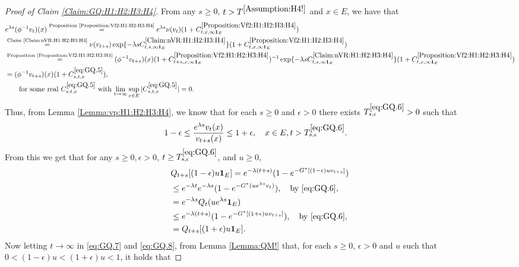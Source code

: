 \documentclass[12pt,a4paper]{amsart}
\numberwithin{equation}{section}
\theoremstyle{plain}
\theoremstyle{definition}
\theoremstyle{remark}
\newcounter{N}
\newcounter{n}[N]
\begin{document}
\begin{proof}[Proof of Claim \ref{Claim:GQ:H1:H2:H3:H4}]
From any $s\geq 0$, $t>T^{\ref{Assumption:H4!}}$ and $x\in E$, we have that
\begin{align}
& e^{\lambda s}(\phi^{-1}v_t)(x) 
\overset{\text{Proposition \ref{Proposition:Vf2:H1:H2:H3:H4}}}= e^{\lambda s}\nu(v_{t})(1+ C^{\ref{Proposition:Vf2:H1:H2:H3:H4}}_{t,x,\infty \mathbf 1_E})
\\&\overset{\text{Claim \ref{Claim:nVR:H1:H2:H3:H4}}}=\nu(v_{t+s}) \exp\{-\lambda sC^{\ref{Claim:nVR:H1:H2:H3:H4}}_{t,s,\infty \mathbf 1_E}\} (1+ C^{\ref{Proposition:Vf2:H1:H2:H3:H4}}_{t,x,\infty \mathbf 1_E})
\\&\overset{\text{Proposition \ref{Proposition:Vf2:H1:H2:H3:H4}}}= (\phi^{-1}v_{t+s})(x) (1+ C^{\ref{Proposition:Vf2:H1:H2:H3:H4}}_{t+s,x,\infty \mathbf 1_E})^{-1} \exp\{-\lambda sC^{\ref{Claim:nVR:H1:H2:H3:H4}}_{t,s,\infty \mathbf 1_E}\} (1+ C^{\ref{Proposition:Vf2:H1:H2:H3:H4}}_{t,x,\infty \mathbf 1_E})
\\& \label{eq:GQ.5}= (\phi^{-1}v_{t+s})(x) (1+C_{s,t,x}^{\eqref{eq:GQ.5}}),
\\&\qquad\text{for some real $C_{s,t,x}^{\eqref{eq:GQ.5}}$ with $\lim_{t\to \infty}\sup_{x\in E} |C_{s,t,x}^{\eqref{eq:GQ.5}}| =0$}.
\end{align}
Thus, from Lemma \ref{Lemma:vp:H1:H2:H3:H4}, we know that for each $s\geq 0$ and $\epsilon >0$ there exists $T^{\eqref{eq:GQ.6}}_{s,\epsilon}>0$ such that
\begin{align} 
\label{eq:GQ.6}
& 1-\epsilon
\leq \frac{e^{\lambda s}v_t(x)}{v_{t+s}(x)} 
\leq 1+\epsilon,
\quad x\in E, t> T^{\eqref{eq:GQ.6}}_{s,\epsilon}. 
\end{align}
From this we get that for any $s\geq 0, \epsilon > 0$, $t\ge T^{\eqref{eq:GQ.6}}_{s,\epsilon}$, and $u\geq 0$,
\begin{align} 
& Q_{t+s}[ (1-\epsilon)u\mathbf 1_E ] 
= e^{-\lambda(t+s)}( 1-e^{-G^*[(1-\epsilon)uv_{t+s}]} ) 
\\ & \leq e^{-\lambda t} e^{-\lambda s}( 1- e^{-G^*(ue^{\lambda s}v_t)} ),\quad\text{by \eqref{eq:GQ.6}},
\\\label{eq:GQ.7}&= e^{-\lambda s}Q_t(ue^{\lambda s} \mathbf 1_E)
\\&\leq e^{-\lambda(t+s)}( 1-e^{-G^*[(1+\epsilon)uv_{t+s}]} ),\quad\text{by \eqref{eq:GQ.6}},
\\\label{eq:GQ.8}&= Q_{t+s}[ (1+\epsilon)u\mathbf 1_E ].
\end{align}
Now letting $t\to \infty$ in \eqref{eq:GQ.7} and \eqref{eq:GQ.8}, from Lemma \ref{Lemma:QM!} that, for each $s\geq 0$, $\epsilon > 0$ and $u$ such that $0 < (1 - \epsilon) u < (1+\epsilon)u < 1$, it holds that

\end{proof}
\end{document}

